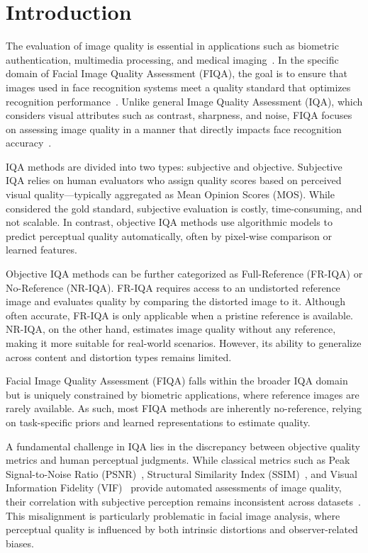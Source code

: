 \section{Introduction}

The evaluation of image quality is essential in applications such as biometric authentication, multimedia processing, and medical imaging~\cite{Kim2015, Huang2020}. In the specific domain of Facial Image Quality Assessment (FIQA), the goal is to ensure that images used in face recognition systems meet a quality standard that optimizes recognition performance~\cite{Cavazos2021}. Unlike general Image Quality Assessment (IQA), which considers visual attributes such as contrast, sharpness, and noise, FIQA focuses on assessing image quality in a manner that directly impacts face recognition accuracy~\cite{Terhoerst2020}.

IQA methods are divided into two types: subjective and objective. Subjective IQA relies on human evaluators who assign quality scores based on perceived visual quality—typically aggregated as Mean Opinion Scores (MOS). While considered the gold standard, subjective evaluation is costly, time-consuming, and not scalable. In contrast, objective IQA methods use algorithmic models to predict perceptual quality automatically, often by pixel-wise comparison or learned features.

Objective IQA methods can be further categorized as Full-Reference (FR-IQA) or No-Reference (NR-IQA). FR-IQA requires access to an undistorted reference image and evaluates quality by comparing the distorted image to it. Although often accurate, FR-IQA is only applicable when a pristine reference is available. NR-IQA, on the other hand, estimates image quality without any reference, making it more suitable for real-world scenarios. However, its ability to generalize across content and distortion types remains limited.

Facial Image Quality Assessment (FIQA) falls within the broader IQA domain but is uniquely constrained by biometric applications, where reference images are rarely available. As such, most FIQA methods are inherently no-reference, relying on task-specific priors and learned representations to estimate quality.

A fundamental challenge in IQA lies in the discrepancy between objective quality metrics and human perceptual judgments. While classical metrics such as Peak Signal-to-Noise Ratio (PSNR)~\cite{gonzalez2002digital}, Structural Similarity Index (SSIM)~\cite{wang2004image}, and Visual Information Fidelity (VIF)~\cite{sheikh2006image} provide automated assessments of image quality, their correlation with subjective perception remains inconsistent across datasets~\cite{Babnik2022}. This misalignment is particularly problematic in facial image analysis, where perceptual quality is influenced by both intrinsic distortions and observer-related biases.

